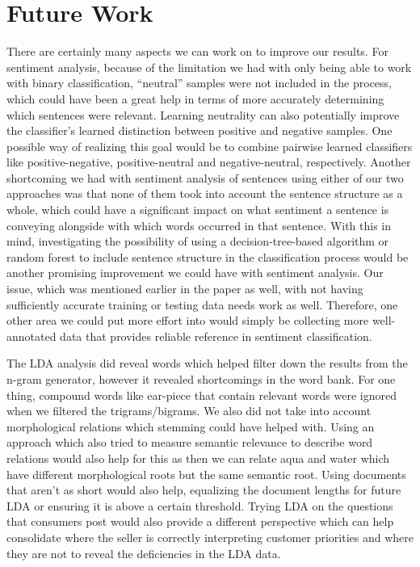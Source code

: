 \documentclass{article}
\begin{document}
\section{Future Work}
There are certainly many aspects we can work on to improve our results. For sentiment analysis, because of the limitation we had with only being able to work with binary classification, “neutral” samples were not included in the process, which could have been a great help in terms of more accurately determining which sentences were relevant. Learning neutrality can also potentially improve the classifier’s learned distinction between positive and negative samples. One possible way of realizing this goal would be to combine pairwise learned classifiers like positive-negative, positive-neutral and negative-neutral,
respectively. Another shortcoming we had with sentiment analysis of sentences using either of our two approaches was that none of them took into account the sentence structure as a whole, which could have a significant impact on what sentiment a sentence is conveying alongside with which words occurred in that sentence. With this in mind, investigating the possibility of using a decision-tree-based algorithm or random forest to include sentence structure in the classification process would be another promising improvement we could have with sentiment analysis. Our issue, which was mentioned earlier in the paper as well, with not having sufficiently accurate training or testing data needs work as well. Therefore, one other area we could put more effort into would simply be collecting more well-annotated data that provides reliable reference in sentiment classification.

The LDA analysis did reveal words which helped filter down the results from the n-gram generator, however it revealed shortcomings in the word bank. For one thing, compound words like ear-piece that contain relevant words were ignored when we filtered the trigrams/bigrams. We also did not take into account morphological relations which stemming could have helped with. Using an approach which also tried to measure semantic relevance to describe word relations would also help for this as then we can relate aqua and water which have different morphological roots but the same semantic root. Using documents that aren't as short would also help, equalizing the document lengths for future LDA or ensuring it is above a certain threshold. Trying LDA on the questions that consumers post would also provide a different perspective which can help consolidate where the seller is correctly interpreting customer priorities and where they are not to reveal the deficiencies in the LDA data. 
\end{document}
